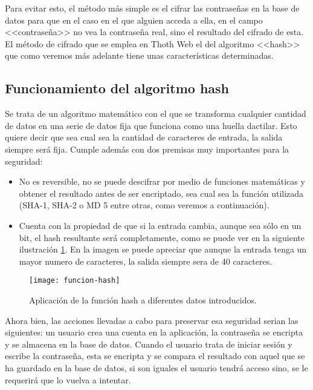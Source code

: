 Para evitar esto, el método más simple es el cifrar las contraseñas en la base de datos para que en el caso en el que alguien acceda a ella, en el campo <<contraseña>> no vea la contraseña real, sino el resultado del cifrado de esta. El método de cifrado que se emplea en Thoth Web el del algoritmo <<hash>> que como veremos más adelante tiene unas características determinadas. 

\subsection{Funcionamiento del algoritmo hash}

Se trata de un algoritmo matemático con el que se transforma cualquier cantidad de datos en una serie de datos fija que funciona como una huella dactilar. Esto quiere decir que sea cual sea la cantidad de caracteres de entrada, la salida siempre será fija. Cumple además con dos premisas muy importantes para la seguridad: 

\begin{itemize}
\item No es reversible, no se puede descifrar por medio de funciones matemáticas y obtener el resultado antes de ser encriptado, sea cual sea la función utilizada (SHA-1, SHA-2 o MD 5 entre otras, como veremos a continuación).
\item Cuenta con la propiedad de que si la entrada cambia, aunque sea sólo en un bit, el hash resultante será completamente, como se puede ver en la siguiente ilustración \ref{fig:3.1}. En la imagen se puede apreciar que aunque la entrada tenga un mayor numero de caracteres, la salida siempre sera de 40 caracteres.

\end{itemize} 

\begin{figure}[h]
\centering
\texttt{[image: funcion-hash]}
\caption{Aplicación de la función hash a diferentes datos introducidos.}
\label{fig:3.1}
\end{figure}

Ahora bien, las acciones llevadas a cabo para preservar esa seguridad serian las siguientes: un usuario crea una cuenta en la aplicación, la contraseña se encripta y se almacena en la base de datos. Cuando el usuario trata de iniciar sesión y escribe la contraseña, esta se encripta y se compara el resultado con aquel que se ha guardado en la base de datos, si son iguales el usuario tendrá acceso sino, se le requerirá que lo vuelva a intentar.

